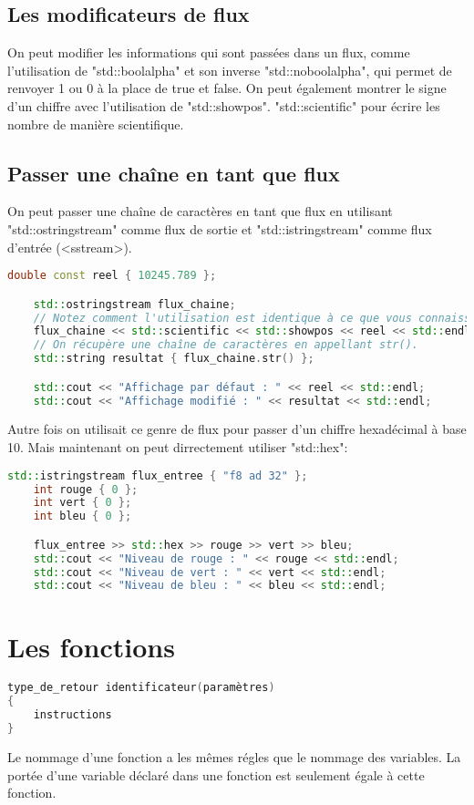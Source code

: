 \documentclass{article}
\begin{document}
\subsection{Les modificateurs de flux}
On peut modifier les informations qui sont passées dans un flux, comme l'utilisation de "std::boolalpha" et son inverse "std::noboolalpha", qui permet de renvoyer 1 ou 0 à la place de true et false.
On peut également montrer le signe d'un chiffre avec l'utilisation de "std::showpos". "std::scientific" pour écrire les nombre de manière scientifique.

\subsection{Passer une chaîne en tant que flux}
On peut passer une chaîne de caractères en tant que flux en utilisant "std::ostringstream" comme flux de sortie et "std::istringstream" comme flux d'entrée (<sstream>).

\begin{lstlisting}[language=C++]
    double const reel { 10245.789 };

    std::ostringstream flux_chaine;
    // Notez comment l'utilisation est identique à ce que vous connaissez.
    flux_chaine << std::scientific << std::showpos << reel << std::endl;
    // On récupère une chaîne de caractères en appellant str().
    std::string resultat { flux_chaine.str() };

    std::cout << "Affichage par défaut : " << reel << std::endl;
    std::cout << "Affichage modifié : " << resultat << std::endl;
\end{lstlisting}{}

Autre fois on utilisait ce genre de flux pour passer d'un chiffre hexadécimal à base 10. Mais maintenant on peut dirrectement utiliser "std::hex":

\begin{lstlisting}[language=C++]
    std::istringstream flux_entree { "f8 ad 32" };
    int rouge { 0 };
    int vert { 0 };
    int bleu { 0 };

    flux_entree >> std::hex >> rouge >> vert >> bleu;
    std::cout << "Niveau de rouge : " << rouge << std::endl;
    std::cout << "Niveau de vert : " << vert << std::endl;
    std::cout << "Niveau de bleu : " << bleu << std::endl;
\end{lstlisting}{}

\section{Les fonctions}
\begin{lstlisting}[language=C++]
type_de_retour identificateur(paramètres)
{
    instructions
}
\end{lstlisting}{}
Le nommage d'une fonction a les mêmes régles que le nommage des variables. La portée d'une variable déclaré dans une fonction est seulement égale à cette fonction.
\end{document}
